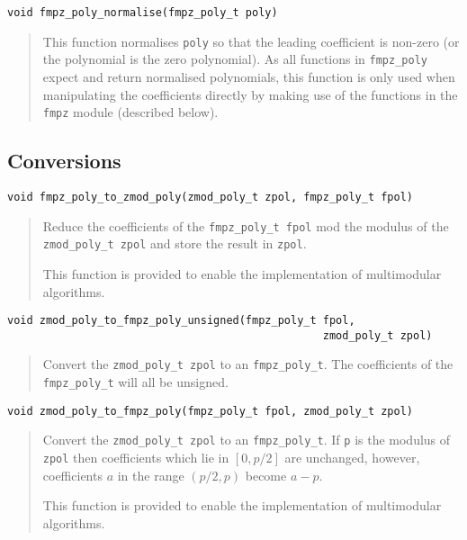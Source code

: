\documentclass[a4paper,10pt]{article}
\newcommand{\code}{\lstinline}
\begin{document}
\begin{lstlisting}
void fmpz_poly_normalise(fmpz_poly_t poly) 
\end{lstlisting}
\begin{quote}
This function normalises \code{poly} so that the leading coefficient is non-zero (or the polynomial is the zero polynomial). As all functions in \code{fmpz_poly} expect and return normalised polynomials, this function is only used when manipulating the coefficients directly by making use of the functions in the \code{fmpz} module (described below).
\end{quote}

\subsection{Conversions}

\begin{lstlisting}
void fmpz_poly_to_zmod_poly(zmod_poly_t zpol, fmpz_poly_t fpol)
\end{lstlisting}
\begin{quote}
Reduce the coefficients of the \code{fmpz_poly_t fpol} mod the modulus of the \code{zmod_poly_t zpol} and store the result in \code{zpol}.

This function is provided to enable the implementation of multimodular algorithms.
\end{quote}

\begin{lstlisting}
void zmod_poly_to_fmpz_poly_unsigned(fmpz_poly_t fpol, 
                                                 zmod_poly_t zpol)
\end{lstlisting}
\begin{quote}
Convert the \code{zmod_poly_t zpol} to an \code{fmpz_poly_t}. The coefficients of the \code{fmpz_poly_t} will all be unsigned.
\end{quote}

\begin{lstlisting}
void zmod_poly_to_fmpz_poly(fmpz_poly_t fpol, zmod_poly_t zpol)
\end{lstlisting}
\begin{quote}
Convert the \code{zmod_poly_t zpol} to an \code{fmpz_poly_t}. If \code{p} is the modulus of \code{zpol} then coefficients which lie in $[0, p/2]$ are unchanged, however, coefficients $a$ in the range $(p/2, p)$ become $a - p$.

This function is provided to enable the implementation of multimodular algorithms.
\end{quote}
\end{document}
